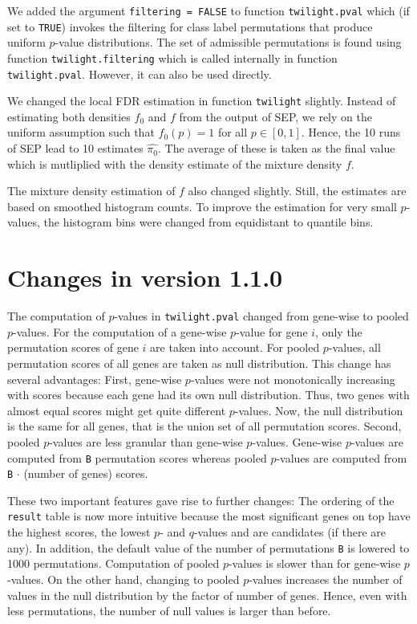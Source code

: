 \documentclass[11pt,a4paper,fleqn]{report}
\newcommand{\Robject}[1]{{\texttt{#1}}}
\newcommand{\Rfunction}[1]{{\texttt{#1}}}
\newcommand{\Rfunarg}[1]{{\texttt{#1}}}
\begin{document}
We added the argument \Rfunarg{filtering = FALSE} to function \Rfunction{twilight.pval} which (if set to \Rfunarg{TRUE}) invokes the filtering for class label permutations that produce uniform $p$-value distributions. The set of admissible permutations is found using function \Rfunarg{twilight.filtering} which is called internally in function \Rfunarg{twilight.pval}. However, it can also be used directly.

We changed the local FDR estimation in function \Rfunction{twilight} slightly. Instead of estimating both densities $f_0$ and $f$ from the output of SEP, we rely on the uniform assumption such that $f_0(p)=1$ for all $p \in [0,1]$. Hence, the 10 runs of SEP lead to 10 estimates $\widehat{\pi_0}$. The average of these is taken as the final value which is mutliplied with the density estimate of the mixture density $f$.

The mixture density estimation of $f$ also changed slightly. Still, the estimates are based on smoothed histogram counts. To improve the estimation for very small $p$-values, the histogram bins were changed from equidistant to quantile bins.
       
       
\section{Changes in version 1.1.0}

The computation of $p$-values in \Rfunction{twilight.pval} changed from gene-wise to pooled $p$-values. For the computation of a gene-wise $p$-value for gene $i$, only the permutation scores of gene $i$ are taken into account. For pooled $p$-values, all permutation scores of all genes are taken as null distribution. This change has several advantages: First, gene-wise $p$-values were not monotonically increasing with scores because each gene had its own null distribution. Thus, two genes with almost equal scores might get quite different $p$-values. Now, the null distribution is the same for all genes, that is the union set of all permutation scores. Second, pooled $p$-values are less granular than gene-wise $p$-values. Gene-wise $p$-values are computed from \Rfunarg{B} permutation scores whereas pooled $p$-values are computed from \Rfunarg{B} $\cdot$ (number of genes) scores.

These two important features gave rise to further changes: The ordering of the \Robject{result} table is now more intuitive because the most significant genes on top have the highest scores, the lowest $p$- and $q$-values and are candidates (if there are any). In addition, the default value of the number of permutations \Rfunarg{B} is lowered to 1000 permutations. Computation of pooled $p$-values is slower than for gene-wise $p$-values. On the other hand, changing to pooled $p$-values increases the number of values in the null distribution by the factor of number of genes. Hence, even with less permutations, the number of null values is larger than before.
\end{document}
